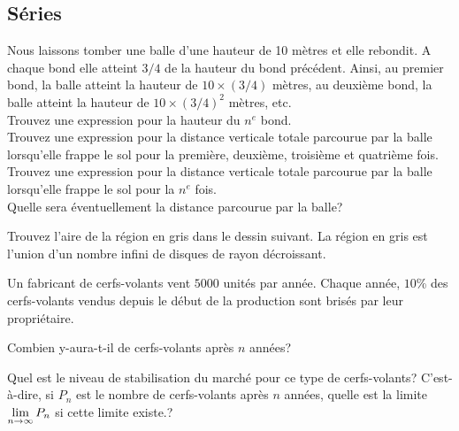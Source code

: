 
\subsection{Séries}

\begin{question}
Nous laissons tomber une balle d'une hauteur de 10 mètres et elle
rebondit.  A chaque bond elle atteint $3/4$ de la hauteur du bond
précédent.  Ainsi, au premier bond, la balle atteint la hauteur de
$10\times(3/4)$ mètres, au deuxième bond, la balle atteint la
hauteur de $10\times(3/4)^2$ mètres, etc.\\
 Trouvez une expression pour la hauteur du $n^e$ bond.\\
 Trouvez une expression pour la distance verticale totale
parcourue par la balle lorsqu'elle frappe le sol pour la première,
deuxième, troisième et quatrième fois.\\
 Trouvez une expression pour la distance verticale totale
parcourue par la balle lorsqu'elle frappe le sol pour la $n^e$ fois.\\
 Quelle sera éventuellement la distance parcourue par la
balle?
\label{3Q2}
\end{question}

\begin{question}
Trouvez l'aire de la région en gris dans le dessin suivant.  La
région en gris est l'union d'un nombre infini de disques de rayon
décroissant.
\label{3Q3}
\end{question}

\begin{question}[\eco]
Un fabricant de cerfs-volants vent $5000$ unités par année.  Chaque
année, $10$\% des cerfs-volants vendus depuis le début de la
production sont brisés par leur propriétaire.

 Combien y-aura-t-il de cerfs-volants après $n$ années?

 Quel est le niveau de stabilisation du marché pour ce type de
cerfs-volants?  C'est-à-dire, si $P_n$ est le nombre de cerfs-volants
après $n$ années, quelle est la limite
$\displaystyle \lim_{n\rightarrow \infty} P_n$ si cette limite existe.?
\label{3Q4}
\end{question}

